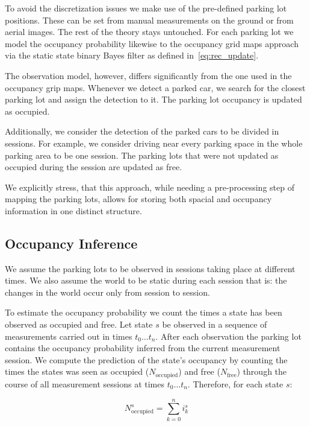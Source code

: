 To avoid the discretization issues we make use of the pre-defined parking lot
positions. These can be set from manual measurements on the ground or from
aerial images. The rest of the theory stays untouched. For each parking lot we
model the occupancy probability likewise to the occupancy grid maps approach
via the static state binary Bayes filter as defined in~\eqref{eq:rec_update}.

The observation model, however, differs significantly from the one used in the
occupancy grip maps. Whenever we detect a parked car, we search for the
closest parking lot and assign the detection to it. The parking lot occupancy
is updated as occupied.

Additionally, we consider the detection of the parked cars to be divided in
sessions. For example, we consider driving near every parking space in the
whole parking area to be one session. The parking lots that were not updated
as occupied during the session are updated as free.

We explicitly stress, that this approach, while needing a pre-processing step
of mapping the parking lots, allows for storing both spacial and occupancy
information in one distinct structure.


\subsection{Occupancy Inference} %
\label{sub:occupancy_inference}

We assume the parking lots to be observed in sessions taking place at
different times. We also assume the world to be static during each session
that is: the changes in the world occur only from session to session.

To estimate the occupancy probability we count the times a state has been
observed as occupied and free. Let state $s$ be observed in a sequence of
measurements carried out in times $t_0 \ldots t_n$. After each observation the
parking lot contains the occupancy probability inferred from the current
measurement session. We compute the prediction of the state's occupancy by
counting the times the states was seen as occupied ($N_\mathrm{occupied}$) and
free ($N_\mathrm{free}$) through the course of all measurement sessions at
times $t_0 \ldots t_n$. Therefore, for each state $s$:

\begin{equation}
    N_\mathrm{occupied}^s = \sum_{k=0}^n i_k^s
\end{equation}

